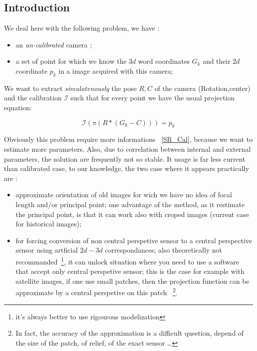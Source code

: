 \subsection{Introduction}

We deal here with the following problem,  we have :

\begin{itemize}
   \item an \emph{un-calibrated} camera ;
   \item a set of point for which we know the  $3d$ word coordinates $G_k$ and their 
        $2d$ coordinate $p_k$ in a image acquired with this camera;
\end{itemize}


We want to extract \emph{simulatenously} the pose $R,C$ of the camera (Rotation,center)  and the calibration
$\mathcal I$ such that for every point we have the usual projection equation:

\begin{equation}
       \mathcal I(\pi (R*(G_k-C))) = p_k \label{EQ:PROJ}
\end{equation}

Obviously this problem require more informations ~\ref{SR_Cal}, because we want to estimate more parameters.
Also, due to correlation between internal and external parameters, the solution
are frequently not so stable. It usage is far less current than calibrated case,
to our knowledge, the two case where it appears practically are :


\begin{itemize}
   \item approximate  orientation of old images for wich we have no idea of focal length and/or principal
        point; one advantage of the method, as it restimate the principal point, is that it can work
        also with croped images (current case for historical images);

   \item for forcing conversion of  non central perspetive sensor to a central perspective sensor
        using  artficial $2d-3d$ correspondances; also theoretically not recommanded~\footnote{it's
        always better to use rigourous modelization}, it can unlock situation where you need to
        use a software that accept only central perspetive sensor; this is the case for example
        with satellite images, if one use small patches, then the projection  function can be
        approximate by a central perspetive on this patch ~\footnote{In fact, the accuracy of
        the approximation is a difficult question, depend of the size of the patch, of relief, 
        of the exact sensor \dots}.
\end{itemize}

